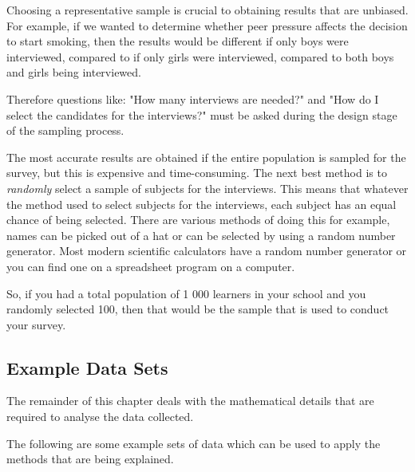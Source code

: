 \begin{description}[noitemsep]
\begin{description}[noitemsep]
\begin{figure}[H]
\begin{center}
    \end{center}
 \end{figure}       
        \par 
        \label{m39403*id200766}Choosing a representative sample is crucial to obtaining results that are unbiased. For example, if we wanted to determine whether peer pressure affects the decision to start smoking, then the results would be different if only boys were interviewed, compared to if only girls were interviewed, compared to both boys and girls being interviewed.\par 
        \label{m39403*id200773}Therefore questions like: "How many interviews are needed?" and "How do I select the candidates for the interviews?" must be asked during the design stage of the sampling process.\par 
        \label{m39403*id200777}The most accurate results are obtained if the entire population is sampled for the survey, but this is expensive and time-consuming. The next best method is to \textit{randomly} select a sample of subjects for the interviews. This means that whatever the method used to select subjects for the interviews, each subject has an equal chance of being selected. There are various methods of doing this for example, names can be picked out of a hat or can be selected by using a random number generator. Most modern scientific calculators have a random number generator or you can find one on a spreadsheet program on a computer.\par 
        \label{m39403*id200791}So, if you had a total population of 1 000 learners in your school and you randomly selected 100, then that would be the sample that is used to conduct your survey.\par 
    \label{m39403*cid4}
            \subsection{ Example Data Sets}
            \nopagebreak
      \label{m39403*id200805}The remainder of this chapter deals with the mathematical details that are required to analyse the data collected.\par 
      \label{m39403*id200809}The following are some example sets of data which can be used to apply the methods that are being explained.\par 
      \label{m39403*uid24}

\end{description}
\end{description}
